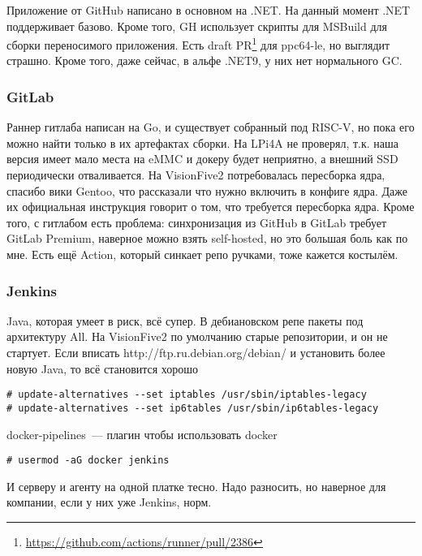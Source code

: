 Приложение от GitHub написано в основном на .NET.
На данный момент .NET поддерживает \riscv{} базово.
Кроме того, GH использует скрипты для MSBuild для сборки переносимого приложения.
Есть draft PR\footnote{
	\url{https://github.com/actions/runner/pull/2386}
} для ppc64-le, но выглядит страшно.
Кроме того, даже сейчас, в альфе .NET9, у них нет нормального GC.

\subsubsection{GitLab}

Раннер гитлаба написан на Go, и существует собранный под RISC-V, но пока его можно найти только в их артефактах сборки.
На LPi4A не проверял, т.к. наша версия имеет мало места на eMMC и докеру будет неприятно, а внешний SSD периодически отваливается.
На VisionFive2 потребовалась пересборка ядра, спасибо вики Gentoo, что рассказали что нужно включить в конфиге ядра.
Даже их официальная инструкция говорит о том, что требуется пересборка ядра.
Кроме того, с гитлабом есть проблема: синхронизация из GitHub в GitLab требует GitLab Premium, наверное можно взять self-hosted, но это большая боль как по мне.
Есть ещё Action, который синкает репо ручками, тоже кажется костылём.

\subsubsection{Jenkins}
Java, которая умеет в риск, всё супер. В дебиановском репе пакеты под архитектуру All. На VisionFive2 по умолчанию старые репозитории, и он не стартует. Если вписать http://ftp.ru.debian.org/debian/ и установить более новую Java, то всё становится хорошо
\begin{verbatim}
# update-alternatives --set iptables /usr/sbin/iptables-legacy
# update-alternatives --set ip6tables /usr/sbin/ip6tables-legacy
\end{verbatim}

docker-pipelines~--- плагин чтобы использовать docker
\begin{verbatim}
# usermod -aG docker jenkins
\end{verbatim}

И серверу и агенту на одной платке тесно.
Надо разносить, но наверное для компании, если у них уже Jenkins, норм.

